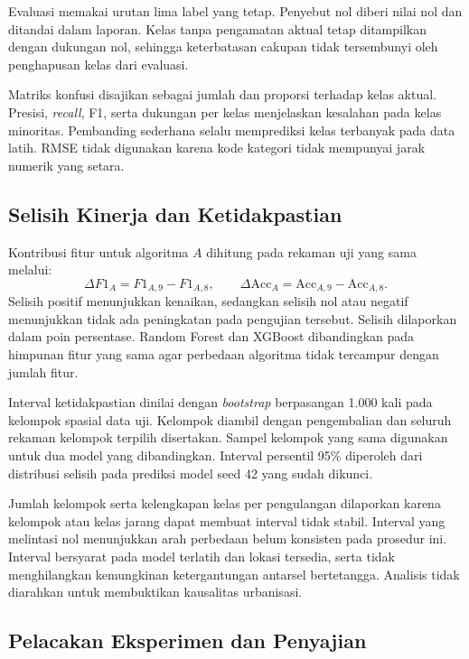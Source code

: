 Evaluasi memakai urutan lima label yang tetap. Penyebut nol diberi nilai nol dan ditandai dalam laporan. Kelas tanpa pengamatan aktual tetap ditampilkan dengan dukungan nol, sehingga keterbatasan cakupan tidak tersembunyi oleh penghapusan kelas dari evaluasi.

Matriks konfusi disajikan sebagai jumlah dan proporsi terhadap kelas aktual. Presisi, \textit{recall}, F1, serta dukungan per kelas menjelaskan kesalahan pada kelas minoritas. Pembanding sederhana selalu memprediksi kelas terbanyak pada data latih. RMSE tidak digunakan karena kode kategori tidak mempunyai jarak numerik yang setara.

\subsection{Selisih Kinerja dan Ketidakpastian}

Kontribusi fitur untuk algoritma $A$ dihitung pada rekaman uji yang sama melalui:
\begin{equation}
    \Delta F1_A=F1_{A,9}-F1_{A,8},\qquad
    \Delta\mathrm{Acc}_A=\mathrm{Acc}_{A,9}-\mathrm{Acc}_{A,8}.
    \label{eq:bab3-delta}
\end{equation}
Selisih positif menunjukkan kenaikan, sedangkan selisih nol atau negatif menunjukkan tidak ada peningkatan pada pengujian tersebut. Selisih dilaporkan dalam poin persentase. Random Forest dan XGBoost dibandingkan pada himpunan fitur yang sama agar perbedaan algoritma tidak tercampur dengan jumlah fitur.

Interval ketidakpastian dinilai dengan \textit{bootstrap} berpasangan 1.000 kali pada kelompok spasial data uji. Kelompok diambil dengan pengembalian dan seluruh rekaman kelompok terpilih disertakan. Sampel kelompok yang sama digunakan untuk dua model yang dibandingkan. Interval persentil 95\% diperoleh dari distribusi selisih pada prediksi model seed 42 yang sudah dikunci.

Jumlah kelompok serta kelengkapan kelas per pengulangan dilaporkan karena kelompok atau kelas jarang dapat membuat interval tidak stabil. Interval yang melintasi nol menunjukkan arah perbedaan belum konsisten pada prosedur ini. Interval bersyarat pada model terlatih dan lokasi tersedia, serta tidak menghilangkan kemungkinan ketergantungan antarsel bertetangga. Analisis tidak diarahkan untuk membuktikan kausalitas urbanisasi.

\subsection{Pelacakan Eksperimen dan Penyajian}

